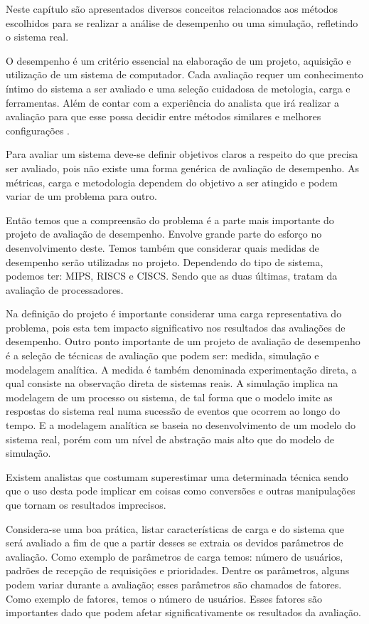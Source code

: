 Neste capítulo são apresentados diversos conceitos relacionados aos métodos escolhidos para se realizar a análise de desempenho ou uma simulação, refletindo o sistema real.

O desempenho  é um critério essencial na elaboração de um projeto, aquisição e utilização de um sistema de computador. Cada avaliação requer um conhecimento íntimo do sistema a ser avaliado e uma seleção cuidadosa de metologia, carga e ferramentas. Além de contar com a experiência do analista que irá realizar a avaliação para que esse possa decidir entre métodos similares e melhores configurações \cite{Jain}.

    Para avaliar um sistema deve-se definir objetivos claros a respeito do que precisa ser avaliado, pois não existe uma forma genérica de avaliação de desempenho. As métricas, carga e metodologia dependem do objetivo a ser atingido e podem variar de um problema para outro.
    
    Então temos que a compreensão do problema é a parte mais importante do projeto de avaliação de desempenho. Envolve grande parte do esforço no desenvolvimento deste. Temos também que considerar quais medidas de desempenho serão utilizadas no projeto. Dependendo do tipo de sistema, podemos ter: MIPS, RISCS e CISCS. Sendo que as duas últimas, tratam da avaliação de processadores.
    
    Na definição do projeto é importante considerar uma carga representativa do problema, pois esta tem impacto significativo nos resultados das avaliações de desempenho. Outro ponto importante de um projeto de avaliação de desempenho é a seleção de técnicas de avaliação que podem ser: medida, simulação e modelagem analítica. A medida é também denominada experimentação direta, a qual consiste na observação direta de sistemas reais. A simulação implica na modelagem de um processo ou sistema, de tal forma que o modelo imite as respostas do sistema real numa sucessão de eventos que ocorrem ao longo do tempo. E a modelagem analítica se baseia no desenvolvimento de um modelo do sistema real, porém com um nível de abstração mais alto que do modelo de simulação.
    
    Existem analistas que costumam superestimar uma determinada técnica sendo que o uso desta pode implicar em coisas como conversões e outras manipulações que tornam os resultados imprecisos.
    
    Considera-se uma boa prática, listar características de carga e do sistema que será avaliado a fim de que a partir desses se extraia os devidos parâmetros de avaliação. Como exemplo de parâmetros de carga temos: número de usuários, padrões de recepção de requisições e prioridades. Dentre os parâmetros, alguns podem variar durante a avaliação; esses parâmetros são chamados de fatores. Como exemplo de fatores, temos o número de usuários. Esses fatores são importantes dado que podem afetar significativamente os resultados da avaliação.
    
